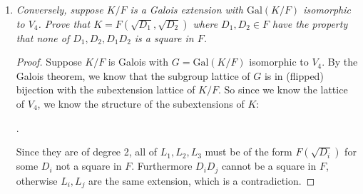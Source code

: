 \documentclass[10pt,oneside,reqno]{amsart}
\theoremstyle{plain}
\theoremstyle{definition}
\theoremstyle{remark}
\theoremstyle{plain}
\newcommand{\z}{\mathbb{Z}}
\newcommand{\bb}{\vspace{3mm}}
\newcommand{\bee}{\begin{equation}\begin{aligned}}
\newcommand{\eee}{\end{aligned}\end{equation}}
\newcommand{\gal}{\text{Gal}}
\newcommand{\qwe}{\sqrt}
\renewcommand{\phi}{\varphi}
\begin{document}
\begin{enumerate}[label=\arabic*.]
\begin{enumerate}
\begin{proof}
Since $D_1,D_2$ are not squares, we know $F(\qwe{D_1})/F$ and $F(\qwe{D_2})/F$ are both extensions of degree 2. And since $D_1D_2$ is not a square, we know that $F(\qwe{D_2})/F(\qwe{D_1})$ is a nontrivial extension (has degree 2). Thus we know that $K/F$ has degree 4.  We wish to first show it is Galois. Let $\alpha = \qwe{D_1},\beta = \qwe{D_2}$. Then $m_{\alpha,F} = x^2 - D_1,m_{\beta,F} = x^2 - D_2$. And since the roots of these are $\pm\alpha,\pm \beta$, we know they are both separable, so $\alpha,\beta$ are separable, so $K/F$ is separable. Also, $K$ is normal since the only conjugates of $\alpha,\beta$ are $-\alpha,-\beta$, so $K/F$ is normal and separable, thus it is Galois. We enumerate the automorphisms of $K$ in the Galois group $G$. We have choices of mappings:
\bee
\alpha &\mapsto \alpha,-\alpha\\
\beta &\mapsto \beta,-\beta.
\eee
So we have:
\bee
1&:\alpha \mapsto \alpha, && \beta \mapsto \beta\\
\phi_1&:\alpha \mapsto -\alpha, && \beta \mapsto \beta\\
\phi_2&:\alpha \mapsto \alpha,  && \beta \mapsto -\beta\\
\phi_3&: \alpha \mapsto -\alpha,  && \beta \mapsto -\beta.
\eee
Clearly, each has order 2, so it is $V_4$. 
\end{proof}
\bb

\item \textit{Conversely, suppose $K/F$ is a Galois extension with $\gal(K/F)$ isomorphic to $V_4$. Prove that $K = F(\qwe{D_1},\qwe{D_2})$ where $D_1,D_2 \in F$ have the property that none of $D_1,D_2,D_1D_2$ is a square in $F$. }

\begin{proof}
Suppose $K/F$ is Galois with $G = \gal(K/F)$ isomorphic to $V_4$. By the Galois theorem, we know that the subgroup lattice of $G$ is in (flipped) bijection with the subextension lattice of $K/F$. So since we know the lattice of $V_4$, we know the structure of the subextensions of $K$:
\begin{center}
.
\end{center}
Since they are of degree 2, all of $L_1,L_2,L_3$ must be of the form $F(\qwe{D_i})$ for some $D_i$ not a square in $F$. Furthermore $D_iD_j$ cannot be a square in $F$, otherwise $L_i,L_j$ are the same extension, which is a contradiction. 
\end{proof}
\end{enumerate}
\end{enumerate}
\end{document}
